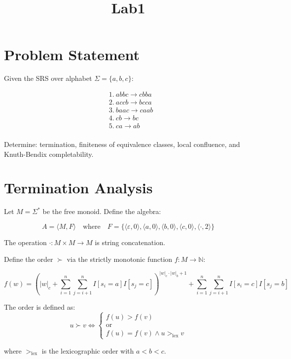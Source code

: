 \documentclass{article}
\title{Lab1}
\begin{document}
\maketitle

\section{Problem Statement}

Given the SRS over alphabet $\Sigma = \{a, b, c\}$:

\begin{align*}
&1.\ abbc \to cbba \\
&2.\ accb \to bcca \\  
&3.\ baac \to caab \\
&4.\ cb \to bc \\
&5.\ ca \to ab \\
\end{align*}

Determine: termination, finiteness of equivalence classes, local confluence, and Knuth-Bendix completability.

\section{Termination Analysis}

Let $M = \Sigma^*$ be the free monoid. Define the algebra:

\[
A = \langle M, F \rangle \quad \text{where} \quad F = \{\langle \varepsilon, 0\rangle, \langle a, 0\rangle, \langle b, 0\rangle, \langle c, 0\rangle, \langle ·, 2\rangle\}
\]

The operation $· : M \times M \to M$ is string concatenation.

Define the order $\succ$ via the strictly monotonic function $f: M \to \mathbb{N}$:

\[
f(w) = \left(|w|_c + \sum_{i=1}^{n}\sum_{j=i+1}^{n}I[s_i = a]I[s_j = c]\right)^{|w|_c \cdot |w|_b+1} + \sum_{i=1}^{n}\sum_{j=i+1}^{n}I[s_i = c]I[s_j = b]
\]

The order is defined as: \\
\[
u \succ v \Leftrightarrow 
\begin{cases}
f(u) > f(v) \\
\text{or} \\
f(u) = f(v) \land u >_{\text{lex}} v
\end{cases}
\]

where $>_{\text{lex}}$ is the lexicographic order with $a < b < c$.
\end{document}
